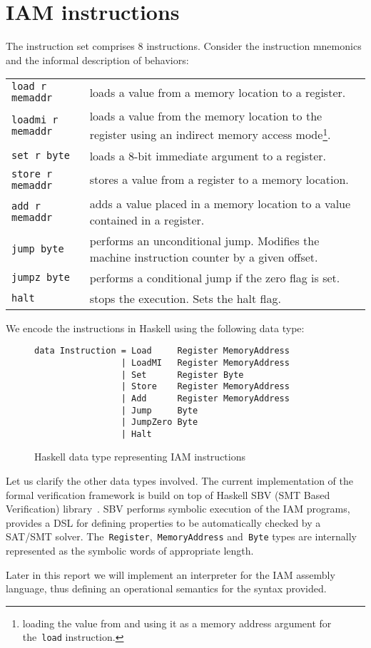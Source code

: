 \section{IAM instructions}
\label{Instructions}

The instruction set comprises 8 instructions. Consider the instruction mnemonics
and the informal description of behaviors:

\begin{longtable}{l|p{8.5cm}}
\texttt{load r memaddr}     & loads a value from a memory location to a register.\\
\texttt{loadmi r memaddr}   & loads a value from the memory location to the register using
an indirect memory access mode\footnote{loading the value from and using it as
a memory address argument for the~\texttt{load} instruction.}.\\
\texttt{set      r byte   } & loads a 8-bit immediate argument to a register.\\
\texttt{store    r memaddr} & stores a value from a register to a memory location.\\
\texttt{add      r memaddr} & adds a value placed in a memory location to a value contained in a register.\\
\texttt{jump     byte     } &  performs an unconditional jump. Modifies the machine
instruction counter by a given offset.\\
\texttt{jumpz    byte     } & performs a conditional jump if the zero flag is set.\\
\texttt{halt              } & stops the execution. Sets the halt flag.
\end{longtable}

We encode the instructions in Haskell using the following data type:

\begin{figure}[H]
\begin{verbatim}
data Instruction = Load     Register MemoryAddress
                 | LoadMI   Register MemoryAddress
                 | Set      Register Byte
                 | Store    Register MemoryAddress
                 | Add      Register MemoryAddress
                 | Jump     Byte
                 | JumpZero Byte
                 | Halt
\end{verbatim}
\label{Instruction}
\caption{Haskell data type representing IAM instructions}
\end{figure}

Let us clarify the other data types involved. The current implementation of the formal verification
framework is build on top of Haskell SBV (SMT Based Verification)
library~\cite{SBV}. SBV performs symbolic execution of the IAM programs,
provides a DSL for defining properties to be automatically checked by a SAT/SMT solver.
The~\texttt{Register},~\texttt{MemoryAddress}
and~\texttt{Byte} types are internally represented as the symbolic
words of appropriate length.

Later in this report we will implement an interpreter for the IAM assembly language,
thus defining an operational semantics for the syntax provided.
